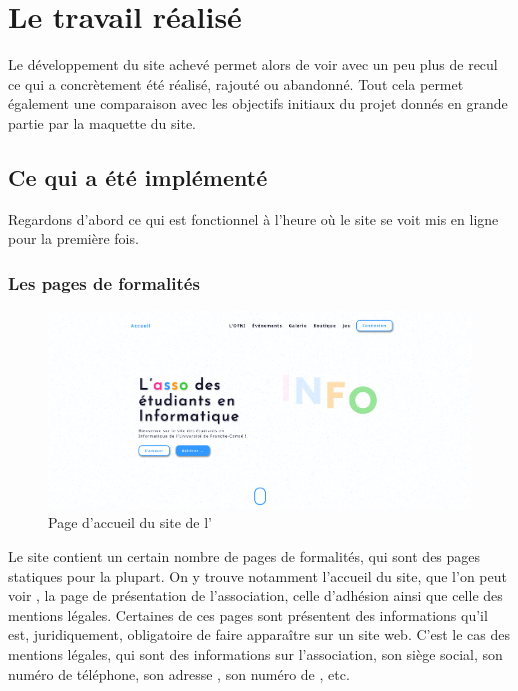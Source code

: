 \chapter{Le travail réalisé}
\label{chap:travail-realise}

Le développement du site achevé permet alors de voir avec un peu plus de recul ce qui a concrètement été réalisé, rajouté ou abandonné. Tout cela permet également une comparaison avec les objectifs initiaux du projet donnés en grande partie par la maquette du site.

\section{Ce qui a été implémenté}
\label{sec:implem}

Regardons d'abord ce qui est fonctionnel à l'heure où le site se voit mis en ligne pour la première fois.

\subsection{Les pages de formalités}
\label{subsec:pages-formalites}

\begin{figure}[h]
    \centering
    \includegraphics[width=\textwidth]{assets/pictures/home-page.png}
    \caption{Page d'accueil du site de l'\ofni}
    \label{fig:home-page}
\end{figure}

Le site contient un certain nombre de pages de formalités, qui sont des pages statiques pour la plupart. On y trouve notamment l'accueil du site, que l'on peut voir , la page de présentation de l'association, celle d'adhésion ainsi que celle des mentions légales. Certaines de ces pages sont présentent des informations qu'il est, juridiquement, obligatoire de faire apparaître sur un site web. C'est le cas des mentions légales, qui sont des informations sur l'association, son siège social, son numéro de téléphone, son adresse , son numéro de , etc.

